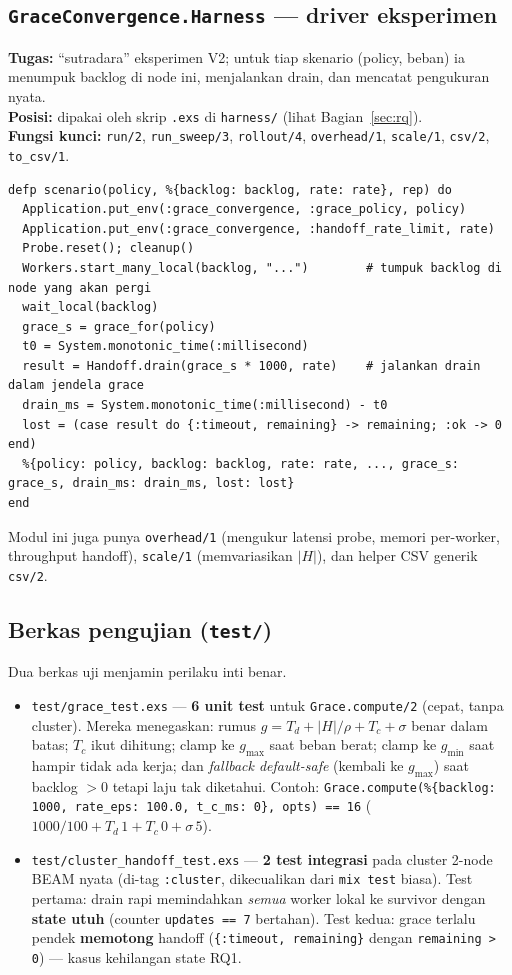 \documentclass[11pt]{article}
\newcommand{\code}[1]{\texttt{\small #1}}
\begin{document}
\subsection{\texttt{GraceConvergence.Harness} --- driver eksperimen}
\textbf{Tugas:} ``sutradara'' eksperimen V2; untuk tiap skenario (policy, beban) ia menumpuk backlog di
node ini, menjalankan drain, dan mencatat pengukuran nyata. \\
\textbf{Posisi:} dipakai oleh skrip \code{.exs} di \code{harness/} (lihat Bagian~\ref{sec:rq}). \\
\textbf{Fungsi kunci:} \code{run/2}, \code{run\_sweep/3}, \code{rollout/4}, \code{overhead/1},
\code{scale/1}, \code{csv/2}, \code{to\_csv/1}.
\begin{lstlisting}[style=ex]
defp scenario(policy, %{backlog: backlog, rate: rate}, rep) do
  Application.put_env(:grace_convergence, :grace_policy, policy)
  Application.put_env(:grace_convergence, :handoff_rate_limit, rate)
  Probe.reset(); cleanup()
  Workers.start_many_local(backlog, "...")        # tumpuk backlog di node yang akan pergi
  wait_local(backlog)
  grace_s = grace_for(policy)
  t0 = System.monotonic_time(:millisecond)
  result = Handoff.drain(grace_s * 1000, rate)    # jalankan drain dalam jendela grace
  drain_ms = System.monotonic_time(:millisecond) - t0
  lost = (case result do {:timeout, remaining} -> remaining; :ok -> 0 end)
  %{policy: policy, backlog: backlog, rate: rate, ..., grace_s: grace_s, drain_ms: drain_ms, lost: lost}
end
\end{lstlisting}
Modul ini juga punya \code{overhead/1} (mengukur latensi probe, memori per-worker, throughput handoff),
\code{scale/1} (memvariasikan $|H|$), dan helper CSV generik \code{csv/2}.

\subsection{Berkas pengujian (\texttt{test/})}
\label{sec:tests}
Dua berkas uji menjamin perilaku inti benar.
\begin{itemize}
  \item \code{test/grace\_test.exs} --- \textbf{6 unit test} untuk \code{Grace.compute/2} (cepat, tanpa
  cluster). Mereka menegaskan: rumus $g = T_d + |H|/\rho + T_c + \sigma$ benar dalam batas; $T_c$ ikut
  dihitung; clamp ke $g_{\max}$ saat beban berat; clamp ke $g_{\min}$ saat hampir tidak ada kerja; dan
  \emph{fallback default-safe} (kembali ke $g_{\max}$) saat backlog $>0$ tetapi laju tak diketahui.
  Contoh: \code{Grace.compute(\%\{backlog: 1000, rate\_eps: 100.0, t\_c\_ms: 0\}, opts) == 16}
  ($1000/100 + T_d\,1 + T_c\,0 + \sigma\,5$).
  \item \code{test/cluster\_handoff\_test.exs} --- \textbf{2 test integrasi} pada cluster 2-node BEAM
  nyata (di-tag \code{:cluster}, dikecualikan dari \code{mix test} biasa). Test pertama: drain rapi
  memindahkan \emph{semua} worker lokal ke survivor dengan \textbf{state utuh} (counter
  \code{updates == 7} bertahan). Test kedua: grace terlalu pendek \textbf{memotong} handoff
  (\code{\{:timeout, remaining\}} dengan \code{remaining > 0}) --- kasus kehilangan state RQ1.
\end{itemize}
\end{document}
